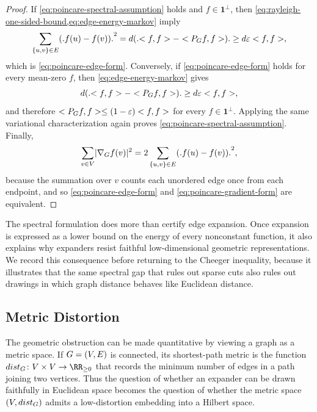 \begin{proof}
	If \cref{eq:poincare-spectral-assumption} holds and \(f\in\mathbf{1}^{\perp}\), then \cref{eq:rayleigh-one-sided-bound,eq:edge-energy-markov} imply
	\begin{equation}
		\label{eq:poincare-proof-forward}
		\sum_{\{u,v\}\in\Edges}\bigl(f(u)-f(v)\bigr)^2
		=d\bigl(\langle f,f\rangle-\langle \Markov{\Graph}f,f\rangle\bigr)
		\geq d\varepsilon\langle f,f\rangle,
	\end{equation}
	which is \cref{eq:poincare-edge-form}. Conversely, if \cref{eq:poincare-edge-form} holds for every mean-zero \(f\), then \cref{eq:edge-energy-markov} gives
	\begin{equation}
		\label{eq:poincare-proof-reverse}
		d\bigl(\langle f,f\rangle-\langle \Markov{\Graph}f,f\rangle\bigr)\geq d\varepsilon\langle f,f\rangle,
	\end{equation}
	and therefore \(< P_{G}f,f>\leq (1-\varepsilon)< f,f>\) for every \(f\in\mathbf{1}^{\perp}\). Applying the same variational characterization again proves \cref{eq:poincare-spectral-assumption}. Finally,
	\begin{equation}
		\label{eq:gradient-counts-edges-twice}
		\sum_{v\in\Vertices}\abs{\nabla_{\Graph} f(v)}^2
		=2\sum_{\{u,v\}\in\Edges}\bigl(f(u)-f(v)\bigr)^2,
	\end{equation}
	because the summation over \(v\) counts each unordered edge once from each endpoint, and so \cref{eq:poincare-edge-form} and \cref{eq:poincare-gradient-form} are equivalent.
\end{proof}

The spectral formulation does more than certify edge expansion. Once expansion is expressed as a lower bound on the energy of every nonconstant function, it also explains why expanders resist faithful low-dimensional geometric representations. We record this consequence before returning to the Cheeger inequality, because it illustrates that the same spectral gap that rules out sparse cuts also rules out drawings in which graph distance behaves like Euclidean distance.

\subsection{Metric Distortion}
\label{subsec:metric-distortion}

The geometric obstruction can be made quantitative by viewing a graph as a metric space. If \(G=(V,E)\) is connected, its shortest-path metric is the function \(\operatorname{dist}_\Graph\colon \Vertices\times \Vertices\to \RR_{\geq 0}\) that records the minimum number of edges in a path joining two vertices. Thus the question of whether an expander can be drawn faithfully in Euclidean space becomes the question of whether the metric space \((V,dist_{G})\) admits a low-distortion embedding into a Hilbert space.


